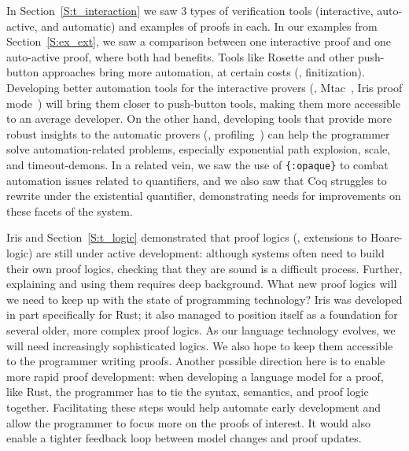 In Section~\ref{S:t_interaction} we saw 3 types of verification tools
(interactive, auto-active, and automatic) and examples of proofs in each. In our
examples from Section~\ref{S:ex_ext}, we saw a comparison between one
interactive proof and one auto-active proof, where both had benefits. Tools like
Rosette and other push-button approaches bring more automation, at certain
costs (\eg, finitization). Developing better automation tools for the
interactive provers (\eg, Mtac~\cite{Kaiser_2018}, Iris proof
mode~\cite{Krebbers_2017b}) will bring them closer to push-button tools, making
them more accessible to an average developer. On the other hand, developing
tools that provide more robust insights to the automatic provers (\eg,
profiling~\cite{Bornholt_2018,Porncharoenwase_2020}) can help the programmer
solve automation-related problems, especially exponential path explosion, scale,
and timeout-demons. In a related vein, we saw the use of \texttt{\{:opaque\}} to
combat automation issues related to quantifiers, and we also saw that Coq
struggles to rewrite under the existential quantifier, demonstrating needs for
improvements on these facets of the system.

Iris and Section~\ref{S:t_logic} demonstrated that proof logics (\eg, extensions
to Hoare-logic) are still under active development: although systems often need
to build their own proof logics, checking that they are sound is a difficult
process. Further, explaining and using them requires deep background. What new
proof logics will we need to keep up with the state of programming technology?
Iris was developed in part specifically for Rust; it also managed to position
itself as a foundation for several older, more complex proof logics. As our
language technology evolves, we will need increasingly sophisticated logics. We
also hope to keep them accessible to the programmer writing proofs. Another
possible direction here is to enable more rapid proof development: when
developing a language model for a proof, like Rust, the programmer has to tie
the syntax, semantics, and proof logic together. Facilitating these steps would
help automate early development and allow the programmer to focus more on the
proofs of interest. It would also enable a tighter feedback loop between model
changes and proof updates.


